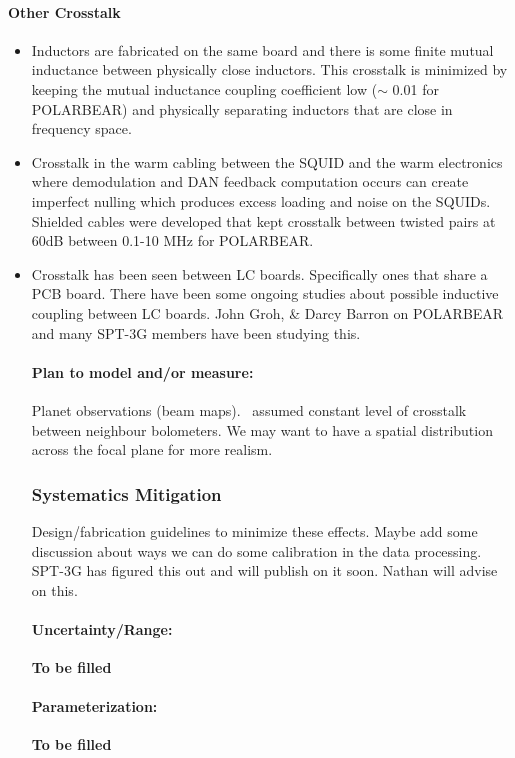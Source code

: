 \paragraph{Other Crosstalk}
\begin{itemize}
\item Inductors are fabricated on the same board and there is some finite mutual inductance between physically close inductors. This crosstalk is minimized by keeping the mutual inductance coupling coefficient low ($\sim$ 0.01 for POLARBEAR) and physically separating inductors that are close in frequency space. 
\item Crosstalk in the warm cabling between the SQUID and the warm electronics where demodulation and DAN feedback computation occurs can create imperfect nulling which produces excess loading and noise on the SQUIDs. Shielded cables were developed that kept crosstalk between twisted pairs at 60dB between 0.1-10 MHz for POLARBEAR.
\item Crosstalk has been seen between LC boards. Specifically ones that share a PCB board. There have been some ongoing studies about possible inductive coupling between LC boards. John Groh, \& Darcy Barron on POLARBEAR and many SPT-3G members have been studying this.

\paragraph{Plan to model and/or measure:}
Planet observations (beam maps). \pb\ assumed constant level of crosstalk between neighbour bolometers. We may want to have a spatial distribution across the focal plane for more realism.
\subsubsection{Systematics Mitigation}
Design/fabrication guidelines to minimize these effects. Maybe add some discussion about ways we can do some calibration in the data processing. SPT-3G has figured this out and will publish on it soon. Nathan will advise on this.

\paragraph{Uncertainty/Range:}
\textbf{To be filled}
\paragraph{Parameterization:}
\textbf{To be filled}


\end{itemize}
